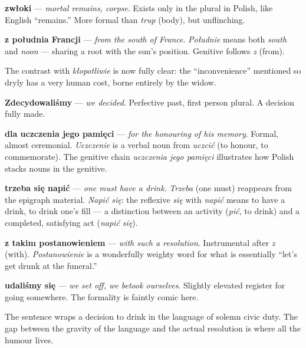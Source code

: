 \textbf{zwłoki} — \textit{mortal remains, corpse}. Exists only in the plural 
in Polish, like English ``remains.'' More formal than \textit{trup} (body), 
but unflinching.

\textbf{z południa Francji} — \textit{from the south of France}. 
\textit{Południe} means both \textit{south} and \textit{noon} — 
sharing a root with the sun's position. Genitive follows \textit{z} (from).

The contrast with \textit{kłopotliwie} is now fully clear: the 
``inconvenience'' mentioned so dryly has a very human cost, borne entirely 
by the widow.



\textbf{Zdecydowaliśmy} — \textit{we decided}. Perfective past, first person 
plural. A decision fully made.

\textbf{dla uczczenia jego pamięci} — \textit{for the honouring of his memory}. 
Formal, almost ceremonial. \textit{Uczczenie} is a verbal noun from 
\textit{uczcić} (to honour, to commemorate). The genitive chain 
\textit{uczczenia jego pamięci} illustrates how Polish stacks nouns in the genitive.

\textbf{trzeba się napić} — \textit{one must have a drink}. 
\textit{Trzeba} (one must) reappears from the epigraph material. 
\textit{Napić się}: the reflexive \textit{się} with \textit{napić} means 
to have a drink, to drink one's fill — a distinction between an activity 
(\textit{pić}, to drink) and a completed, satisfying act (\textit{napić się}).

\textbf{z takim postanowieniem} — \textit{with such a resolution}. 
Instrumental after \textit{z} (with). \textit{Postanowienie} is a wonderfully 
weighty word for what is essentially ``let's get drunk at the funeral.''

\textbf{udaliśmy się} — \textit{we set off, we betook ourselves}. Slightly 
elevated register for going somewhere. The formality is faintly comic here.

The sentence wraps a decision to drink in the language of solemn civic duty. 
The gap between the gravity of the language and the actual resolution is where 
all the humour lives.

